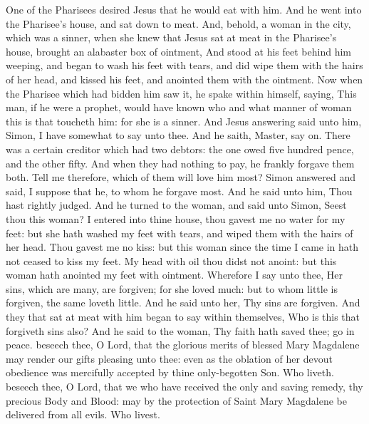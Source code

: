  One of the Pharisees desired Jesus that he would eat with him. And he went into the Pharisee's house, and sat down to meat. And, behold, a woman in the city, which was a sinner, when she knew that Jesus sat at meat in the Pharisee's house, brought an alabaster box of ointment, And stood at his feet behind him weeping, and began to wash his feet with tears, and did wipe them with the hairs of her head, and kissed his feet, and anointed them with the ointment. Now when the Pharisee which had bidden him saw it, he spake within himself, saying, This man, if he were a prophet, would have known who and what manner of woman this is that toucheth him: for she is a sinner. And Jesus answering said unto him, Simon, I have somewhat to say unto thee. And he saith, Master, say on. There was a certain creditor which had two debtors: the one owed five hundred pence, and the other fifty. And when they had nothing to pay, he frankly forgave them both. Tell me therefore, which of them will love him most? Simon answered and said, I suppose that he, to whom he forgave most. And he said unto him, Thou hast rightly judged. And he turned to the woman, and said unto Simon, Seest thou this woman? I entered into thine house, thou gavest me no water for my feet: but she hath washed my feet with tears, and wiped them with the hairs of her head. Thou gavest me no kiss: but this woman since the time I came in hath not ceased to kiss my feet. My head with oil thou didst not anoint: but this woman hath anointed my feet with ointment. Wherefore I say unto thee, Her sins, which are many, are forgiven; for she loved much: but to whom little is forgiven, the same loveth little. And he said unto her, Thy sins are forgiven. And they that sat at meat with him began to say within themselves, Who is this that forgiveth sins also? And he said to the woman, Thy faith hath saved thee; go in peace.
\secret
{} beseech thee, O Lord, that the glorious merits of blessed Mary Magdalene may render our gifts pleasing unto thee: even as the oblation of her devout obedience was mercifully accepted by thine only-begotten Son. Who liveth.
\postcommunion
{} beseech thee, O Lord, that we who have received the only and saving remedy, thy precious Body and Blood: may by the protection of Saint Mary Magdalene be delivered from all evils. Who livest.


